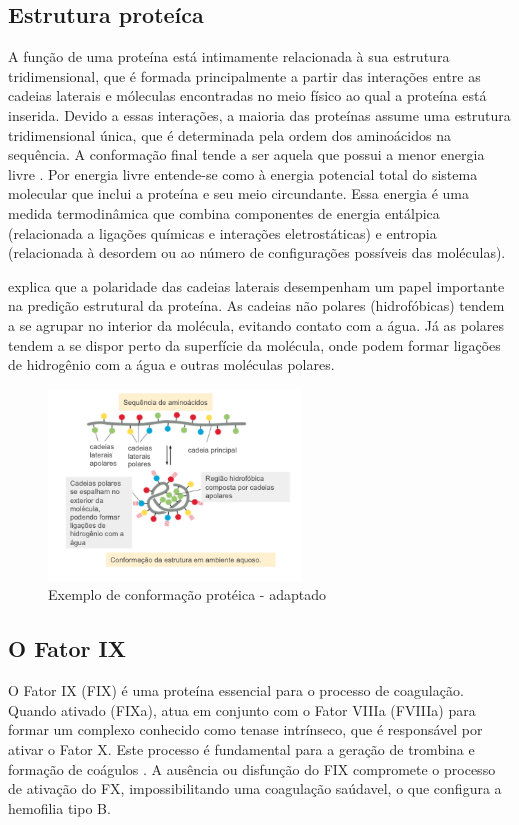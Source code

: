 \subsection{Estrutura proteíca}

A função de uma proteína está intimamente relacionada à sua estrutura tridimensional,
que é formada principalmente a partir das interações entre as cadeias laterais e móleculas encontradas no meio físico ao qual
a proteína está inserida. Devido a essas interações, a maioria das proteínas assume uma estrutura tridimensional única,
que é determinada pela ordem dos aminoácidos na sequência. 
A conformação final tende a ser aquela que possui a menor energia livre \cite{Bio}.
Por energia livre entende-se como à energia potencial total do sistema molecular que inclui a proteína e seu meio circundante. 
Essa energia é uma medida termodinâmica que combina componentes de energia entálpica (relacionada a ligações químicas e interações eletrostáticas) 
e entropia (relacionada à desordem ou ao número de configurações possíveis das moléculas).

\cite{Bio} explica que a polaridade das cadeias laterais desempenham um papel importante na predição estrutural da proteína. 
As cadeias não polares (hidrofóbicas) tendem a se agrupar no interior da molécula, 
evitando contato com a água. 
Já as polares tendem a se dispor perto da superfície da molécula,
onde podem formar ligações de hidrogênio com a água e outras moléculas polares. 

\begin{figure}[H]
     \centering
     \includegraphics[width=0.6\textwidth]{figuras/ConformacaoProteica.png}
     \caption[Exemplo de conformação protéica]{Exemplo de conformação protéica \cite{Bio} - adaptado}
\end{figure}


\subsection{O Fator IX}
O Fator IX (FIX) é uma proteína essencial para o processo de coagulação.
Quando ativado (FIXa), atua em conjunto com o Fator VIIIa (FVIIIa) para formar 
um complexo conhecido como tenase intrínseco, que é responsável por ativar o Fator X. 
Este processo é fundamental para a geração de trombina e formação de coágulos \cite{FIX}. 
A ausência ou disfunção do FIX compromete o processo de ativação do FX,
impossibilitando uma coagulação saúdavel, o que configura a hemofilia tipo B.

